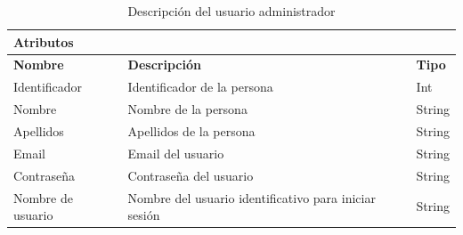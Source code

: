 \begin{table}[H]
    \centering
    \begin{tabularx}{\textwidth}{|p{2.5cm}|X|p{1.5cm}|}
        \hline
        \multicolumn{3}{|l|}{\textbf{Atributos}} \\       
        \hline
        \textbf{Nombre} & \textbf{Descripción} & \textbf{Tipo} \\
        \hline
        Identificador & Identificador de la persona & Int \\  
        \hline
        Nombre & Nombre de la persona & String\\ 
        \hline
        Apellidos & Apellidos de la persona & String \\ 
        \hline
        Email & Email del usuario & String \\ 
        \hline
        Contraseña & Contraseña del usuario & String \\ 
        \hline
        Nombre de usuario & Nombre del usuario identificativo para iniciar sesión & String \\ 
        \hline
    \end{tabularx}
    \caption{Descripción del usuario administrador}
    \label{tab:administrador_atributos}
\end{table}

